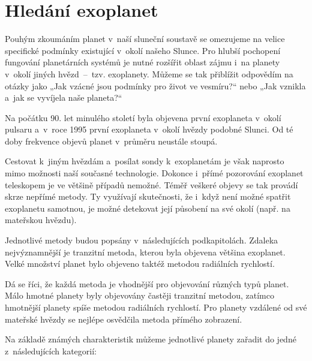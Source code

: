 \documentclass[a4paper,12pt]{article}
\begin{document}
\section{Hledání exoplanet}

Pouhým zkoumáním planet v~naší sluneční soustavě se omezujeme na velice specifické podmínky existující v~okolí našeho Slunce. Pro hlubší pochopení fungování planetárních systémů je nutné rozšířit oblast zájmu i~na planety v~okolí jiných hvězd~--~tzv. exoplanety. Můžeme se tak přiblížit odpovědím na otázky jako „Jak vzácné jsou podmínky pro život ve vesmíru?“ nebo „Jak vznikla a~jak se vyvíjela naše planeta?“~\cite{exoplanets}

Na počátku 90. let minulého století byla objevena první exoplaneta v~okolí pulsaru a~v~roce 1995 první exoplaneta v~okolí hvězdy podobné Slunci. Od té doby frekvence objevů planet v~průměru neustále stoupá.~\cite{exoplanets,nasadata}


Cestovat k~jiným hvězdám a~posílat sondy k~exoplanetám je však naprosto mimo možnosti naší současné technologie. Dokonce i~přímé pozorování exoplanet teleskopem je ve většině případů nemožné. Téměř veškeré objevy se tak provádí skrze nepřímé metody. Ty využívají skutečnosti, že i~když není možné spatřit exoplanetu samotnou, je možné detekovat její působení na své okolí (např. na mateřskou hvězdu).

Jednotlivé metody budou popsány v~následujících podkapitolách. Zdaleka nejvýznamnější je tranzitní metoda, kterou byla objevena většina exoplanet. Velké množství planet bylo objeveno taktéž metodou radiálních rychlostí.~\cite{nasadata}


Dá se říci, že každá metoda je vhodnější pro objevování různých typů planet. Málo hmotné planety byly objevovány častěji tranzitní metodou, zatímco hmotnější planety spíše metodou radiálních rychlostí. Pro planety vzdálené od své mateřské hvězdy se nejlépe osvědčila metoda přímého zobrazení.~\cite{nasadata}


\newpage

Na základě známých charakteristik můžeme jednotlivé planety zařadit do jedné z~následujících kategorií:
\end{document}

